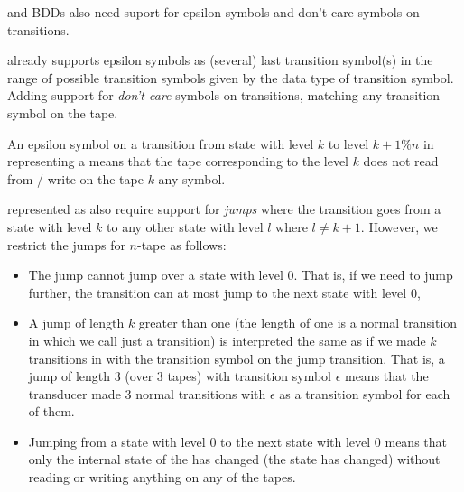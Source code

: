 \nfts and BDDs also need suport for epsilon symbols and don't care symbols on transitions.

\mata already supports epsilon symbols as (several) last transition symbol(s) in the range of possible transition symbols given by the data type of transition symbol.
Adding support for \emph{don't care} symbols on transitions, matching any transition symbol on the tape.

An epsilon symbol on a transition from state with level $k$ to level $k + 1 \% n$ in \nfaClass representing a \nft means that the tape corresponding to the level $k$ does not read from / write on the tape $k$ any symbol.

\nfts represented as \nfaClass also require support for \emph{jumps} where the transition goes from a state with level $k$ to any other state with level $l$ where $l \neq k + 1$.
However, we restrict the jumps for $n$-tape \nft as follows:
\begin{itemize}
  \item The jump cannot jump over a state with level $0$.
  That is, if we need to jump further, the transition can at most jump to the next state with level $0$,
  \item A jump of length $k$ greater than one (the length of one is a normal transition in \nfaClass which we call just a transition) is interpreted the same as if we made $k$ transitions in \nfaClass with the transition symbol on the jump transition.
  That is, a jump of length $3$ (over $3$ tapes) with transition symbol $\epsilon$ means that the transducer made $3$ normal transitions with $\epsilon$ as a transition symbol for each of them.
  \item Jumping from a state with level $0$ to the next state with level $0$ means that only the internal state of the \nft has changed (the state has changed) without reading or writing anything on any of the tapes.
\end{itemize}





